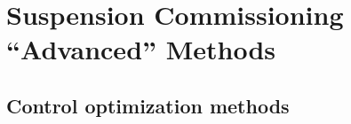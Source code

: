 \section{Suspension Commissioning ``Advanced'' Methods \label{sec:suspension_commissioning_advanced_methods}}
\subsection{Control optimization methods}
\subsection{}